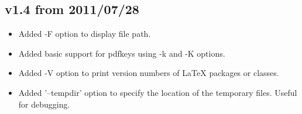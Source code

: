 \documentclass{ydoc}
\begin{document}
\subsection*{v1.4 from 2011/07/28}
\begin{itemize}
 \item Added -F option to display file path.
 \item Added basic support for pdfkeys using -k and -K options.
 \item Added -V option to print version numbers of LaTeX packages or classes.
 \item Added '--tempdir' option to specify the location of the temporary files. Useful for debugging.
\end{itemize}
\end{document}
